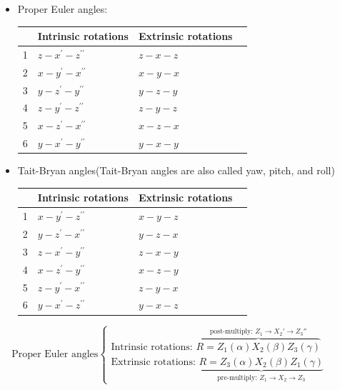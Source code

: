 \begin{itemize}
\item Proper Euler angles:

\begin{center}
    \begin{tabular}{ | l | l | l | p{5cm} |}
    \hline
      & Intrinsic rotations & Extrinsic rotations\\ \hline 
    1 & $z-x^{\prime}-z^{\prime\prime}$ & $z-x-z$ \\ \hline
    2 & $x-y^{\prime}-x^{\prime\prime}$ & $x-y-x$ \\ \hline
    3 & $y-z^{\prime}-y^{\prime\prime}$ & $y-z-y$ \\ \hline
    4 & $z-y^{\prime}-z^{\prime\prime}$ & $z-y-z$ \\ \hline
    5 & $x-z^{\prime}-x^{\prime\prime}$ & $x-z-x$ \\ \hline
    6 & $y-x^{\prime}-y^{\prime\prime}$ & $y-x-y$ \\ \hline
    \end{tabular}
\end{center}

\item Tait-Bryan angles(Tait-Bryan angles are also called yaw, pitch, and roll)

\begin{center}
    \begin{tabular}{ | l | l | l | p{5cm} |}
    \hline
      & Intrinsic rotations & Extrinsic rotations\\ \hline 
    1 & $x-y^{\prime}-z^{\prime\prime}$ & $x-y-z$ \\ \hline
    2 & $y-z^{\prime}-x^{\prime\prime}$ & $y-z-x$ \\ \hline
    3 & $z-x^{\prime}-y^{\prime\prime}$ & $z-x-y$ \\ \hline
    4 & $x-z^{\prime}-y^{\prime\prime}$ & $x-z-y$ \\ \hline
    5 & $z-y^{\prime}-x^{\prime\prime}$ & $z-y-x$ \\ \hline
    6 & $y-x^{\prime}-z^{\prime\prime}$ & $y-x-z$ \\ \hline
    \end{tabular}
\end{center}
\end{itemize}

\begin{equation*}
 \text{Proper Euler angles} 
 \left\{
 \begin{aligned}
        \text{Intrinsic rotations: $\overbrace{R = Z_1(\alpha)X_2(\beta)Z_3(\gamma)}^\text{post-multiply: $Z_1 \to X_2' \to Z_3''$}$}\\
        \text{Extrinsic rotations: $\underbrace{R = Z_3(\alpha)X_2(\beta)Z_1(\gamma)}_\text{pre-multiply: $Z_1 \to X_2 \to Z_3$}$}
 \end{aligned}
 \right.\
 \qquad
\end{equation*}

